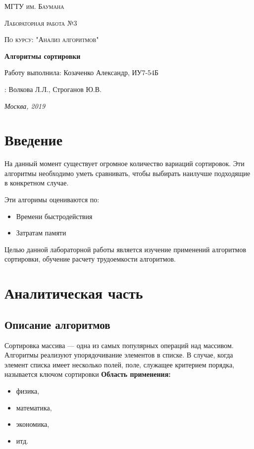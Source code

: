 \documentclass[12pt]{report}
\begin{document}
	\begin{titlepage}
		\centering
		{\scshape\LARGE МГТУ им. Баумана \par}
		\vspace{3cm}
		{\scshape\Large Лабораторная работа №3\par}
		\vspace{0.5cm}	
		{\scshape\Large По курсу: "Анализ алгоритмов"\par}
		\vspace{1.5cm}
		{\huge\bfseries Алгоритмы сортировки\par}
		\vspace{2cm}
		\Large Работу выполнила: Козаченко Александр, ИУ7-54Б\par
		\vspace{0.5cm}
		:  Волкова Л.Л., Строганов Ю.В.\par
		
		\vfill
		\large \textit {Москва, 2019} \par
	\end{titlepage}
	
	\tableofcontents
	
	\newpage
	\chapter*{Введение}
	
	На данный момент существует огромное количество вариаций сортировок.
	Эти алгоритмы необходимо уметь сравнивать, чтобы выбирать наилучше подходящие в конкретном случае. 
	
	Эти алгоримы оцениваются по:
	
	\begin{itemize}
		\item Времени быстродействия
		\item Затратам памяти
	\end{itemize}
	
	Целью данной лабораторной работы является изучение применений алгоритмов сортировки, обучение расчету трудоемкости алгоритмов.
	
	
	\chapter{Аналитическая часть}
	\section{Описание алгоритмов}
	Сортировка массива — одна из самых популярных операций над массивом. Алгоритмы реализуют упорядочивание элементов в списке.
	В случае, когда элемент списка имеет несколько полей, поле, служащее критерием порядка, называется ключом сортировки
	\textbf{Область применения:} 
	\begin{itemize}
		\item физика,
		\item математика,
		\item экономика,
		\item итд.
	\end{itemize}
	
\end{document}

